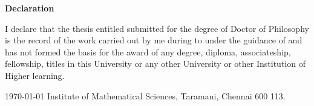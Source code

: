 \newpage
\thispagestyle{empty}
\begin{center}{\Huge \bf Declaration}\end{center}
\vspace{2cm}

I declare that the thesis entitled \emph{\thetitle} submitted for the
degree of Doctor of Philosophy is the record of the work carried out
by me during \emph{\thethesisstartdate} to \emph{\thethesisenddate}
under the guidance of \emph{\theadvisor} and has not formed the basis
for the award of any degree, diploma, associateship, fellowship,
titles in this University or any other University or other Institution
of Higher learning.



\vspace{1cm} 
\noindent\theauthor\hfil\today\break
\ifx\thesubjectofthesis\relax{\relac}
\fi
Institute of Mathematical Sciences,\hfil\break
Taramani, Chennai 600 113.

